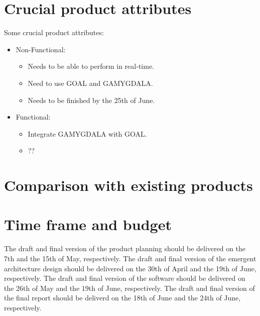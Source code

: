 \documentclass[11pt]{article}
\begin{document}
\section{Crucial product attributes}
Some crucial product attributes:
\begin{itemize}
\item Non-Functional:
\begin{itemize}
\item Needs to be able to perform in real-time.
\item Need to use GOAL and GAMYGDALA.
\item Needs to be finished by the 25th of June.
\end{itemize}
\item Functional:
\begin{itemize}
\item Integrate GAMYGDALA with GOAL.
\item ??
\end{itemize}
\end{itemize}



\section{Comparison with existing products}


\section{Time frame and budget}
The draft and final version of the product planning should be delivered on the 7th and the 15th of May, respectively. 
The draft and final version of the emergent architecture design should be delivered on the 30th of April and the 19th of June, respectively.
The draft and final version of the software should be delivered on the 26th of May and the 19th of June, respectively.
The draft and final version of the final report should be deliverd on the 18th of June and the 24th of June, respectively.
\end{document}
